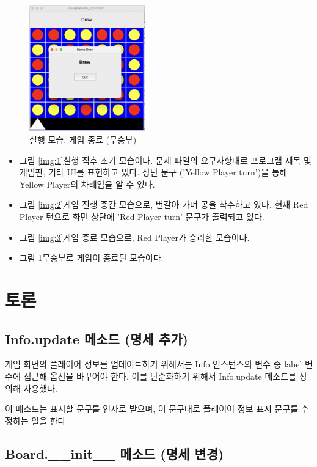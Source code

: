 \documentclass{article}
\begin{document}
\begin{figure}
  \begin{center}
    \includegraphics[width=5cm]{assets/screenshots/draw1.png}
    \caption{실행 모습. 게임 종료 (무승부)}
    \label{img:4}
  \end{center}
\end{figure}

\begin{itemize}
  \item 그림 \ref{img:1}\은 실행 직후 초기 모습이다. 문제 파일의 요구사항대로 프로그램 제목 및 게임판, 기타 UI를 표현하고 있다. 상단 문구 ('Yellow Player turn')을 통해 Yellow Player의 차례임을 알 수 있다.
  \item 그림 \ref{img:2}\은 게임 진행 중간 모습으로, 번갈아 가며 공을 착수하고 있다. 현재 Red Player 턴으로 화면 상단에 'Red Player turn' 문구가 출력되고 있다.
  \item 그림 \ref{img:3}\은 게임 종료 모습으로, Red Player가 승리한 모습이다.
  \item 그림 \ref{img:4}\은 무승부로 게임이 종료된 모습이다.
\end{itemize}

\section{토론}

\subsection{Info.update 메소드 (명세 추가)}

게임 화면의 플레이어 정보를 업데이트하기 위해서는 Info 인스턴스의 변수
중 label 변수에 접근해 옵선을 바꾸어야 한다. 이를 단순화하기 위해서
Info.update 메소드를 정의해 사용했다.

이 메소드는 표시할 문구를 인자로 받으며, 이 문구대로 플레이어 정보 표시 문구를 수정하는 일을 한다.

\subsection{Board.\_\_init\_\_ 메소드 (명세 변경)}
\end{document}
